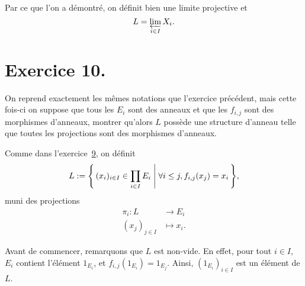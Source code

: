 \documentclass{../../td}
\begin{document}
  Par ce que l'on a démontré, on définit bien une limite projective et \[
  L = \varprojlim_{i \in I} X_i
  .\]

  \chapter{Exercice 10.}

  \begin{slshape}
    \color{deepblue}
    On reprend exactement les mêmes notations que l'exercice précédent, mais cette fois-ci on suppose que tous les $E_i$ sont des anneaux et que les $f_{i,j}$ sont des morphismes d'anneaux, montrer qu'alors $L$ possède une structure d'anneau telle que toutes les projections sont des morphismes d'anneaux.
  \end{slshape}

  Comme dans l'exercice~\hyperref[exo-9]{9}, on définit \[
    L := \mleft\{\, (x_i)_{i \in I} \in \prod_{i \in I} E_i \;\middle|\; \forall i \le j, f_{i,j}(x_j) = x_i\,\mright\} 
  ,\]
  muni des projections \begin{align*}
    \pi_i: L &\longrightarrow E_i \\
    (x_j)_{j \in I} &\longmapsto x_i
  .\end{align*}

  Avant de commencer, remarquons que $L$ est non-vide.
  En effet, pour tout $i \in I$, $E_i$ contient l'élément $1_{E_i}$, et $f_{i,j}(1_{E_i}) = 1_{E_j}$.
  Ainsi, $(1_{E_i})_{i \in I}$ est un élément de $L$.
\end{document}

